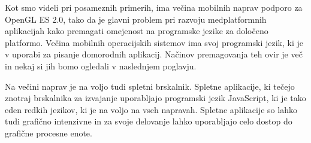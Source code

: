 Kot smo videli pri posameznih primerih, ima večina mobilnih naprav podporo za OpenGL ES 2.0, tako da je glavni problem pri razvoju medplatformnih aplikacijah kako premagati omejenost na programske jezike za določeno platformo. Večina mobilnih operacijskih sistemov ima svoj programski jezik, ki je v uporabi za pisanje domorodnih aplikacij. Načinov premagovanja teh ovir je več in nekaj si jih bomo ogledali v naslednjem poglavju. 

Na večini naprav je na voljo tudi spletni brskalnik. Spletne aplikacije, ki tečejo znotraj brskalnika za izvajanje uporabljajo programski jezik JavaScript, ki je tako eden redkih jezikov, ki je na voljo na vseh napravah. Spletne aplikacije so lahko tudi grafično intenzivne in za svoje delovanje lahko uporabljajo celo dostop do grafične procesne enote.
